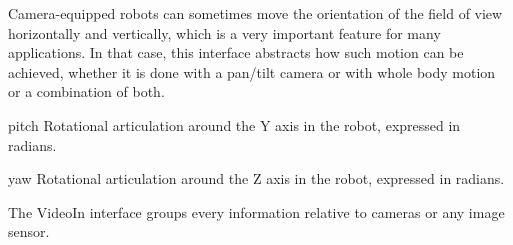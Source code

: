 
Camera-equipped robots can sometimes move the orientation of the field of
view horizontally and vertically, which is a very important feature for many
applications. In that case, this interface abstracts how such motion can be
achieved, whether it is done with a pan/tilt camera or with whole body
motion or a combination of both.

\begin{urbiscriptapi}
\item[pitch] Rotational articulation around the Y axis in the robot,
  expressed in radians.


\item[yaw] Rotational articulation around the Z axis in the robot, expressed
  in radians.
\end{urbiscriptapi}


The VideoIn interface groups every information relative to cameras or any
image sensor.

